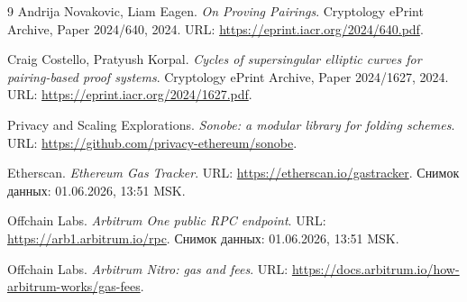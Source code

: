 \documentclass[12pt,a4paper]{article}
\begin{document}
\begin{thebibliography}{9}
Andrija Novakovic, Liam Eagen.
\emph{On Proving Pairings}.
Cryptology ePrint Archive, Paper 2024/640, 2024.
URL: \url{https://eprint.iacr.org/2024/640.pdf}.

Craig Costello, Pratyush Korpal.
\emph{Cycles of supersingular elliptic curves for pairing-based proof systems}.
Cryptology ePrint Archive, Paper 2024/1627, 2024.
URL: \url{https://eprint.iacr.org/2024/1627.pdf}.

Privacy and Scaling Explorations.
\emph{Sonobe: a modular library for folding schemes}.
URL: \url{https://github.com/privacy-ethereum/sonobe}.

Etherscan.
\emph{Ethereum Gas Tracker}.
URL: \url{https://etherscan.io/gastracker}.
Снимок данных: 01.06.2026, 13:51 MSK.

Offchain Labs.
\emph{Arbitrum One public RPC endpoint}.
URL: \url{https://arb1.arbitrum.io/rpc}.
Снимок данных: 01.06.2026, 13:51 MSK.

Offchain Labs.
\emph{Arbitrum Nitro: gas and fees}.
URL: \url{https://docs.arbitrum.io/how-arbitrum-works/gas-fees}.
\end{thebibliography}
\end{document}
